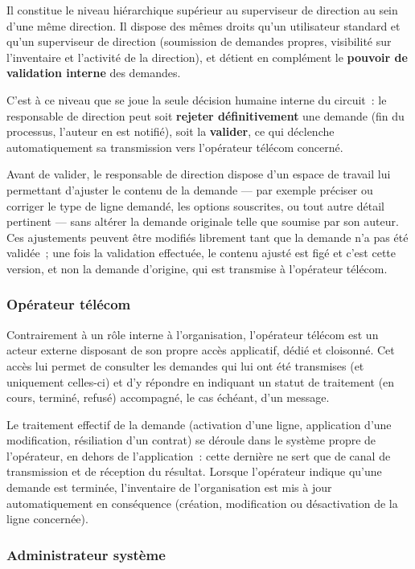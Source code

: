 \documentclass[11pt,a4paper]{article}
\begin{document}
Il constitue le niveau hiérarchique supérieur au superviseur de direction au sein d'une même direction. Il dispose des mêmes droits qu'un utilisateur standard et qu'un superviseur de direction (soumission de demandes propres, visibilité sur l'inventaire et l'activité de la direction), et détient en complément le \textbf{pouvoir de validation interne} des demandes.

C'est à ce niveau que se joue la seule décision humaine interne du circuit~: le responsable de direction peut soit \textbf{rejeter définitivement} une demande (fin du processus, l'auteur en est notifié), soit la \textbf{valider}, ce qui déclenche automatiquement sa transmission vers l'opérateur télécom concerné.

Avant de valider, le responsable de direction dispose d'un espace de travail lui permettant d'ajuster le contenu de la demande --- par exemple préciser ou corriger le type de ligne demandé, les options souscrites, ou tout autre détail pertinent --- sans altérer la demande originale telle que soumise par son auteur. Ces ajustements peuvent être modifiés librement tant que la demande n'a pas été validée~; une fois la validation effectuée, le contenu ajusté est figé et c'est cette version, et non la demande d'origine, qui est transmise à l'opérateur télécom.

\subsubsection{Opérateur télécom}

Contrairement à un rôle interne à l'organisation, l'opérateur télécom est un acteur externe disposant de son propre accès applicatif, dédié et cloisonné. Cet accès lui permet de consulter les demandes qui lui ont été transmises (et uniquement celles-ci) et d'y répondre en indiquant un statut de traitement (en cours, terminé, refusé) accompagné, le cas échéant, d'un message.

Le traitement effectif de la demande (activation d'une ligne, application d'une modification, résiliation d'un contrat) se déroule dans le système propre de l'opérateur, en dehors de l'application~: cette dernière ne sert que de canal de transmission et de réception du résultat. Lorsque l'opérateur indique qu'une demande est terminée, l'inventaire de l'organisation est mis à jour automatiquement en conséquence (création, modification ou désactivation de la ligne concernée).

\subsubsection{Administrateur système}
\end{document}
